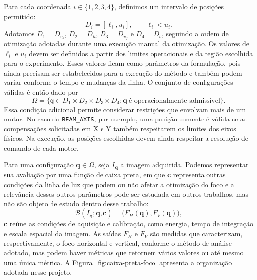 \documentclass[12pt,a4paper]{article}
\begin{document}
Para cada coordenada $i\in\{1,2,3,4\}$, definimos um intervalo de posições permitido:
\begin{equation}
    D_i=[\ell_i,u_i], \qquad \ell_i<u_i.
    \label{eq:limites-motores}
\end{equation}
Adotamos $D_1=D_{v_b}$, $D_2=D_h$, $D_3=D_{v_f}$ e $D_4=D_b$, seguindo a ordem de otimização adotadas durante uma execução manual da otimização. Os valores de $\ell_i$ e $u_i$ devem ser definidos a partir dos limites operacionais e da região escolhida para o experimento. Esses valores ficam como parâmetros da formulação, pois ainda precisam ser estabelecidos para a execução do método e também podem variar conforme o tempo e mudanças da linha. O conjunto de configurações válidas é então dado por
\begin{equation}
    \Omega=\{\mathbf{q}\in D_1\times D_2\times D_3\times D_4:
    \mathbf{q}\ \text{é operacionalmente admissível}\}.
    \label{eq:dominio-otimizacao}
\end{equation}
Essa condição adicional permite considerar restrições que envolvam mais de um motor. No caso do \texttt{BEAM\_AXIS}, por exemplo, uma posição somente é válida se as compensações solicitadas em X e Y também respeitarem os limites dos eixos físicos. Na execução, as posições escolhidas devem ainda respeitar a resolução de comando de cada motor.

Para uma configuração $\mathbf{q}\in\Omega$, seja $I_{\mathbf{q}}$ a imagem adquirida. Podemos representar sua avaliação por uma função de caixa preta, em que \textbf{c} representa outras condições da linha de luz que podem ou não afetar a otimização do foco e a relevância desses outros parâmetros pode ser estudada em outros trabalhos, mas não são objeto de estudo dentro desse trabalho:
\begin{equation}
    \mathcal{B}(I_{\mathbf{q}};\mathbf{q},\mathbf{c})
    =\bigl(F_H(\mathbf{q}),F_V(\mathbf{q})\bigr),
    \label{eq:caixa-preta-foco}
\end{equation}
$\mathbf{c}$ reúne as condições de aquisição e calibração, como energia, tempo de integração e escala espacial da imagem. As saídas $F_H$ e $F_V$ são medidas que caracterizam, respectivamente, o foco horizontal e vertical, conforme o método de análise adotado, mas podem haver métricas que retornem vários valores ou até mesmo uma única métrica. A Figura~\ref{fig:caixa-preta-foco} apresenta a organização adotada nesse projeto.
\end{document}

